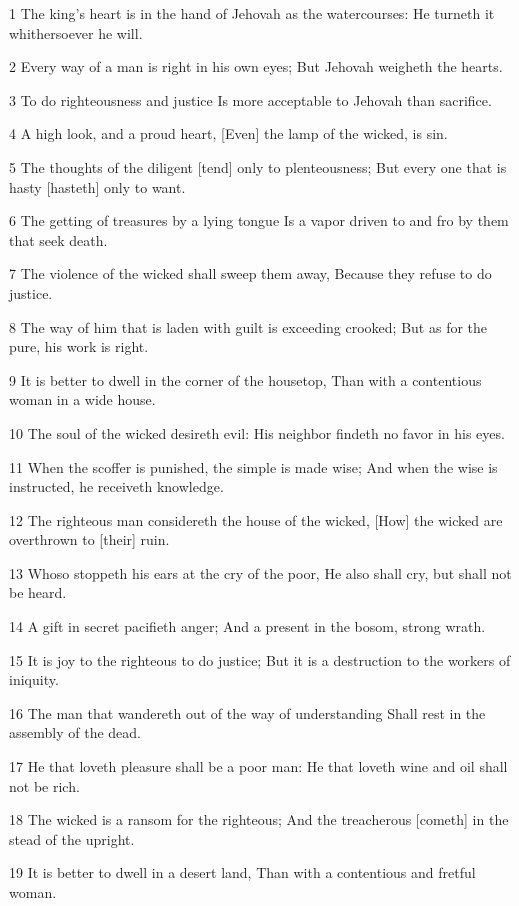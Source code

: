 \par 1 The king's heart is in the hand of Jehovah as the watercourses: He turneth it whithersoever he will.
\par 2 Every way of a man is right in his own eyes; But Jehovah weigheth the hearts.
\par 3 To do righteousness and justice Is more acceptable to Jehovah than sacrifice.
\par 4 A high look, and a proud heart, [Even] the lamp of the wicked, is sin.
\par 5 The thoughts of the diligent [tend] only to plenteousness; But every one that is hasty [hasteth] only to want.
\par 6 The getting of treasures by a lying tongue Is a vapor driven to and fro by them that seek death.
\par 7 The violence of the wicked shall sweep them away, Because they refuse to do justice.
\par 8 The way of him that is laden with guilt is exceeding crooked; But as for the pure, his work is right.
\par 9 It is better to dwell in the corner of the housetop, Than with a contentious woman in a wide house.
\par 10 The soul of the wicked desireth evil: His neighbor findeth no favor in his eyes.
\par 11 When the scoffer is punished, the simple is made wise; And when the wise is instructed, he receiveth knowledge.
\par 12 The righteous man considereth the house of the wicked, [How] the wicked are overthrown to [their] ruin.
\par 13 Whoso stoppeth his ears at the cry of the poor, He also shall cry, but shall not be heard.
\par 14 A gift in secret pacifieth anger; And a present in the bosom, strong wrath.
\par 15 It is joy to the righteous to do justice; But it is a destruction to the workers of iniquity.
\par 16 The man that wandereth out of the way of understanding Shall rest in the assembly of the dead.
\par 17 He that loveth pleasure shall be a poor man: He that loveth wine and oil shall not be rich.
\par 18 The wicked is a ransom for the righteous; And the treacherous [cometh] in the stead of the upright.
\par 19 It is better to dwell in a desert land, Than with a contentious and fretful woman.
